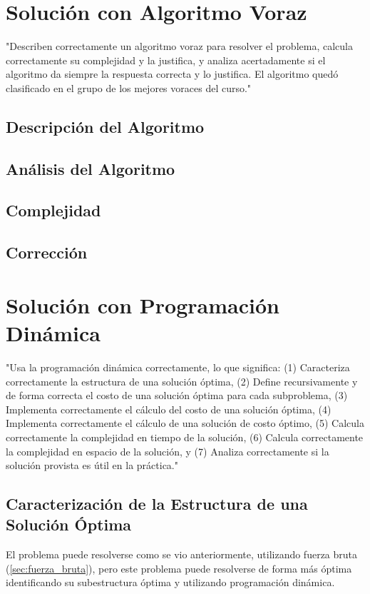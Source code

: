 \documentclass[letterpaper,10pt]{article}
\begin{document}
\section{Solución con Algoritmo Voraz}
\label{sec:algoritmo_voraz}
"Describen correctamente un algoritmo voraz para resolver el problema, calcula correctamente su complejidad y la justifica, y analiza acertadamente si el algoritmo da siempre la respuesta correcta y lo justifica. El algoritmo quedó clasificado en el grupo de los mejores voraces del curso."
\subsection{Descripción del Algoritmo}
\label{subsec:descripcion_algoritmo_voraz}
\subsection{Análisis del Algoritmo}
\label{subsec:analisis_algoritmo_voraz}
\subsection{Complejidad}
\label{subsec:complejidad_algoritmo_voraz}
\subsection{Corrección}
\label{subsec:correccion_algoritmo_voraz}

\section{Solución con Programación Dinámica}
\label{sec:programacion_dinamica}
"Usa la programación dinámica correctamente, lo que significa: (1) Caracteriza correctamente la estructura de una solución óptima, (2) Define recursivamente y de forma correcta el costo de una solución óptima para cada subproblema, (3) Implementa correctamente el cálculo del costo de una solución óptima, (4) Implementa correctamente el cálculo de una solución de costo óptimo, (5) Calcula correctamente la complejidad en tiempo de la solución, (6) Calcula correctamente la complejidad en espacio de la solución, y (7) Analiza correctamente si la solución provista es útil en la práctica."
\subsection{Caracterización de la Estructura de una Solución Óptima}
\label{subsec:caracterizacion_solucion_optima}
El problema puede resolverse como se vio anteriormente, utilizando fuerza bruta (\ref{sec:fuerza_bruta}), pero este problema puede resolverse de forma más óptima identificando su subestructura óptima y utilizando programación dinámica.
\end{document}
